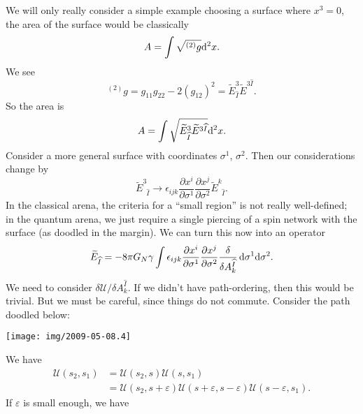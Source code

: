We will only really consider a simple example choosing a surface where
$x^{3}=0$, the area of the surface would be classically
\begin{equation}
A = \int\sqrt{{}^{(2)}g}\mathrm{d}^{2}x.
\end{equation}
We see
\begin{equation}
{}^{(2)}g = g_{11}g_{22} - 2(g_{12})^{2} = \widetilde{E}^{3}_{\widehat{I}} \widetilde{E}^{3\widehat{I}}.
\end{equation}
So the area is
\begin{equation}
A = \int\sqrt{\widetilde{E}^{3}_{\widehat{I}} \widetilde{E}^{3\widehat{I}}}\mathrm{d}^{2}x.
\end{equation}
Consider a more general surface with coordinates $\sigma^{1}$, $\sigma^{2}$.
Then our considerations change by
\begin{equation}
\widetilde{E}^{3}_{\phantom{3}\widehat{I}}\to\epsilon_{ijk}\frac{\partial x^{i}}{\partial\sigma^{1}}\frac{\partial x^{j}}{\partial\sigma^{2}}\widetilde{E}^{k}_{\phantom{k}\widehat{I}}.
\end{equation}
In the classical arena, the criteria for a ``small region'' is not
really well-defined; in the quantum arena, we just require a single
piercing of a spin network with the surface (as doodled in the margin). We can turn this now into an
operator
\begin{equation}
\widetilde{E}_{\widehat{I}} = -8\pi G_{N}\gamma\int\epsilon_{ijk}\frac{\partial x^{i}}{\partial\sigma^{1}}\frac{\partial x^{j}}{\partial\sigma^{2}}\frac{\delta}{\delta
A^{\widehat{I}}_{k}}\,\mathrm{d}\sigma^{1}\mathrm{d}\sigma^{2}.
\end{equation}
We need to consider $\delta\mathcal{U}/\delta A^{\widehat{I}}_{k}$. If
we didn't have path-ordering, then this would be trivial. But we must be
careful, since things do not commute. Consider the path doodled below:
\begin{center}
  \texttt{[image: img/2009-05-08.4]}
\end{center}
We have
\begin{subequations}
  \begin{align}
    \mathcal{U}(s_{2},s_{1})
    &= \mathcal{U}(s_{2},s)\mathcal{U}(s,s_{1})\\
    &= \mathcal{U}(s_{2},s+\varepsilon)\mathcal{U}(s+\varepsilon,s-\varepsilon)\mathcal{U}(s-\varepsilon,s_{1}).
  \end{align}
\end{subequations}
If $\varepsilon$ is small enough, we have
